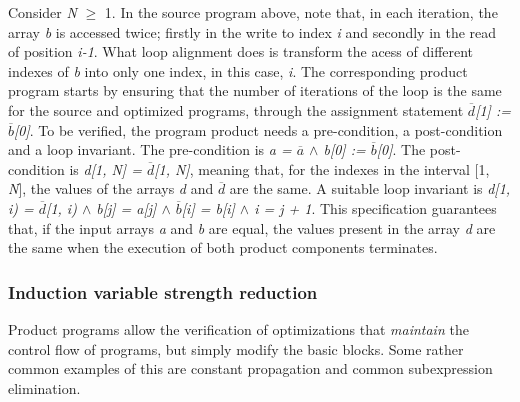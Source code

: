 \bigskip
Consider \emph{N} $\geq$ 1.
In the source program above, note that, in each iteration, the array \emph{b} is accessed twice; firstly in the write to index \emph{i} and secondly in the read of position \emph{i-1}.
What loop alignment does is transform the acess of different indexes of \emph{b} into only one index, in this case, \emph{i}.
The corresponding product program starts by ensuring that the number of iterations of the loop is the same for the source and optimized programs, through the assignment statement \emph{$\overline{d}$[1] := $\overline{b}$[0]}.
To be verified, the program product needs a pre-condition, a post-condition and a loop invariant.
The pre-condition is \emph{a = $\overline{a}$ $\land$ b[0] := $\overline{b}$[0]}.
The post-condition is \emph{d[1, N] = $\overline{d}$[1, N]}, meaning that, for the indexes in the interval [1, \emph{N}], the values of the arrays \emph{d} and \emph{$\overline{d}$} are the same.
A suitable loop invariant is \emph{d[1, i) = $\overline{d}$[1, i)  $\land$  b[j] = a[j]  $\land$  $\overline{b}$[i] = b[i]  $\land$  i = j + 1}.
This specification guarantees that, if the input arrays \emph{a} and \emph{b} are equal, the values present in the array \emph{d} are the same when the execution of both product components terminates.


\subsubsection{Induction variable strength reduction} 
\label{subsubsec:product_programs_strength_reduction}

Product programs allow the verification of optimizations that \emph{maintain} the control flow of programs, but simply modify the basic blocks.
Some rather common examples of this are constant propagation and common subexpression elimination.
\bigskip

